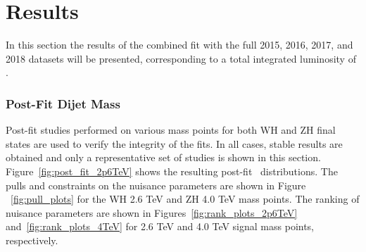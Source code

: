 \graphicspath{{Ch6_Results/figures/}}

\chapter{Results}
\label{ch:results}
In this section the results of the combined fit with the full 2015, 2016, 2017, and 2018 datasets will be presented, corresponding to a total integrated luminosity of \lumi.

\subsection{Post-Fit Dijet Mass}

Post-fit studies performed on various mass points for both WH and ZH final states are used to verify the integrity of the fits.
In all cases, stable results are obtained and only a representative set of studies is shown in this section.
Figure~\ref{fig:post_fit_2p6TeV} shows the resulting post-fit \mvh\ distributions.
The pulls and constraints on the nuisance parameters are shown in Figure ~\ref{fig:pull_plots} for the WH 2.6 TeV and ZH 4.0 TeV mass points.
The ranking of nuisance parameters are shown in Figures~\ref{fig:rank_plots_2p6TeV} and~\ref{fig:rank_plots_4TeV} for 2.6 TeV and 4.0 TeV signal mass points, respectively.

